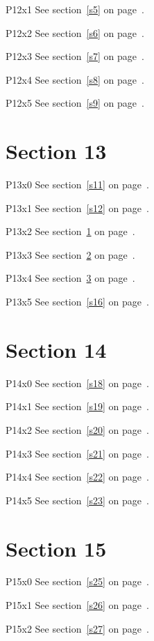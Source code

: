 P12x1 \w\w\w\w\w\w See section~\ref{s5} on page~\pageref{s37}.

P12x2 \w\w\w\w\w\w See section~\ref{s6} on page~\pageref{s38}.

P12x3 \w\w\w\w\w\w See section~\ref{s7} on page~\pageref{s39}.

P12x4 \w\w\w\w\w\w See section~\ref{s8} on page~\pageref{s0}.

P12x5 \w\w\w\w\w\w See section~\ref{s9} on page~\pageref{s1}.

\section{Section 13}\label{s13}
P13x0 \w\w\w\w\w\w See section~\ref{s11} on page~\pageref{s39}.

P13x1 \w\w\w\w\w\w See section~\ref{s12} on page~\pageref{s0}.

P13x2 \w\w\w\w\w\w See section~\ref{s13} on page~\pageref{s1}.

P13x3 \w\w\w\w\w\w See section~\ref{s14} on page~\pageref{s2}.

P13x4 \w\w\w\w\w\w See section~\ref{s15} on page~\pageref{s3}.

P13x5 \w\w\w\w\w\w See section~\ref{s16} on page~\pageref{s4}.

\section{Section 14}\label{s14}
P14x0 \w\w\w\w\w\w See section~\ref{s18} on page~\pageref{s2}.

P14x1 \w\w\w\w\w\w See section~\ref{s19} on page~\pageref{s3}.

P14x2 \w\w\w\w\w\w See section~\ref{s20} on page~\pageref{s4}.

P14x3 \w\w\w\w\w\w See section~\ref{s21} on page~\pageref{s5}.

P14x4 \w\w\w\w\w\w See section~\ref{s22} on page~\pageref{s6}.

P14x5 \w\w\w\w\w\w See section~\ref{s23} on page~\pageref{s7}.

\section{Section 15}\label{s15}
P15x0 \w\w\w\w\w\w See section~\ref{s25} on page~\pageref{s5}.

P15x1 \w\w\w\w\w\w See section~\ref{s26} on page~\pageref{s6}.

P15x2 \w\w\w\w\w\w See section~\ref{s27} on page~\pageref{s7}.

